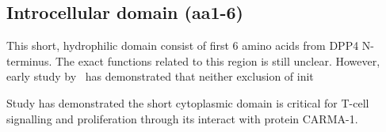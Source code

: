 \subsection{Introcellular domain (aa1-6)}

This short, hydrophilic domain consist of first 6 amino acids from DPP4 N-terminus. The exact functions related to this region is still unclear. However, early study by~\citet{Hong1990} has demonstrated that neither exclusion of init

Study has demonstrated the short cytoplasmic domain is critical for T-cell signalling and proliferation through its interact with protein CARMA-1. \cite{Ohnuma_2007}